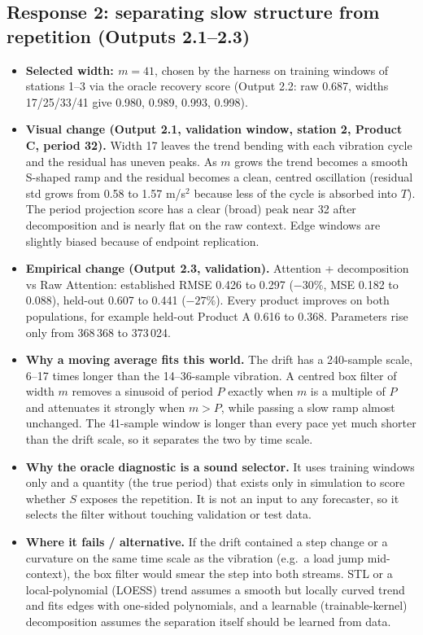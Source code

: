 \subsection*{Response 2: separating slow structure from repetition (Outputs 2.1--2.3)}

\begin{itemize}
  \item \textbf{Selected width: $m=41$}, chosen by the harness on training windows of
        stations 1--3 via the oracle recovery score (Output 2.2: raw 0.687, widths
        17/25/33/41 give 0.980, 0.989, 0.993, 0.998).
  \item \textbf{Visual change (Output 2.1, validation window, station 2, Product C,
        period 32).} Width 17
        leaves the trend bending with each vibration cycle and the residual has uneven
        peaks. As $m$ grows the trend becomes a smooth S-shaped ramp and the residual
        becomes a clean, centred oscillation (residual std grows from 0.58 to 1.57
        m/s$^2$ because less of the cycle is absorbed into $T$). The period projection
        score has a clear (broad) peak near 32 after decomposition and is nearly flat on
        the raw context.
        Edge windows are slightly biased because of endpoint replication.
  \item \textbf{Empirical change (Output 2.3, validation).} Attention + decomposition
        vs Raw Attention: established RMSE 0.426 to 0.297 ($-30\%$, MSE 0.182 to 0.088),
        held-out 0.607 to 0.441 ($-27\%$). Every product improves on both populations,
        for example held-out Product A 0.616 to 0.368. Parameters rise only from 368\,368 to
        373\,024.
  \item \textbf{Why a moving average fits this world.} The drift has a 240-sample scale,
        6--17 times longer than the 14--36-sample vibration. A centred box filter of
        width $m$ removes a sinusoid of period $P$ exactly when $m$ is a multiple of
        $P$ and attenuates it strongly when $m>P$, while passing a slow ramp almost
        unchanged. The 41-sample window is longer than every pace yet much shorter than
        the drift scale, so it separates the two by time scale.
  \item \textbf{Why the oracle diagnostic is a sound selector.} It uses training
        windows only and a quantity (the true period) that exists only in simulation to
        score whether $S$ exposes the repetition. It is not an input to any forecaster,
        so it selects the filter without touching validation or test data.
  \item \textbf{Where it fails / alternative.} If the drift contained a step change or
        a curvature on the same time scale as the vibration (e.g.\ a load jump
        mid-context), the box filter would smear the step into both streams. STL or a
        local-polynomial (LOESS) trend assumes a smooth but locally curved trend and
        fits edges with one-sided polynomials, and a learnable (trainable-kernel)
        decomposition assumes the separation itself should be learned from data.
\end{itemize}

